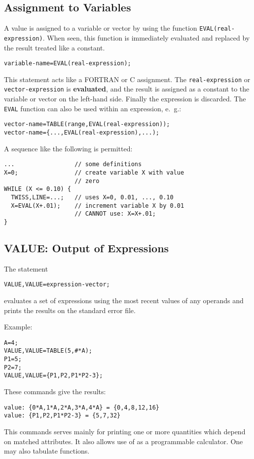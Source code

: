 \subsection{Assignment to Variables}
\label{sec:eval}
A value is assigned to a variable or vector by using the function
\texttt{EVAL(real- expression)}.
When seen, this function is immediately evaluated and replaced by the
result treated like a constant.
\begin{verbatim}
variable-name=EVAL(real-expression);
\end{verbatim}
This statement acts like a FORTRAN or C assignment.
The \texttt{real-expression} or \texttt{vector-expression} is
\textbf{evaluated}, 
and the result is assigned as a constant to the variable or vector on
the left-hand side. 
Finally the expression is discarded.
The \texttt{EVAL} function can also be used within an expression, e.~g.:
\begin{verbatim}
vector-name=TABLE(range,EVAL(real-expression));
vector-name={...,EVAL(real-expression),...);
\end{verbatim}
A sequence like the following is permitted:
\begin{verbatim}
...                 // some definitions
X=0;                // create variable X with value 
                    // zero
WHILE (X <= 0.10) {
  TWISS,LINE=...;   // uses X=0, 0.01, ..., 0.10
  X=EVAL(X+.01);    // increment variable X by 0.01
                    // CANNOT use: X=X+.01;
}
\end{verbatim}

\subsection{VALUE: Output of Expressions}
\label{sec:value}
The statement
\begin{verbatim}
VALUE,VALUE=expression-vector;
\end{verbatim}
evaluates a set of expressions using the most recent values of
any operands and prints the results on the standard error file.

\noindent Example:
\begin{verbatim}
A=4;
VALUE,VALUE=TABLE(5,#*A);
P1=5;
P2=7;
VALUE,VALUE={P1,P2,P1*P2-3};
\end{verbatim}
These commands give the results:
\begin{verbatim}
value: {0*A,1*A,2*A,3*A,4*A} = {0,4,8,12,16}
value: {P1,P2,P1*P2-3} = {5,7,32}
\end{verbatim}
This commands serves mainly for printing one or more quantities
which depend on matched attributes.
It also allows use of \opal as a programmable calculator.
One may also tabulate functions.



